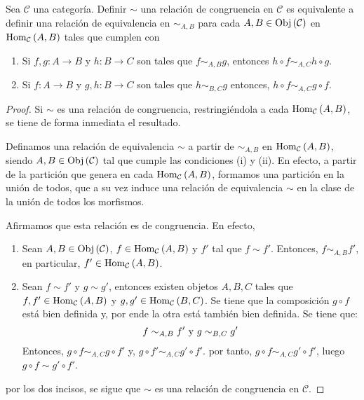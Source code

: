 \documentclass[12pt]{report}
\theoremstyle{largebreak}
\newcommand\cf[3]{\ensuremath{#1:#2\rightarrow#3}}
\newcommand{\Obj}[1]{\ensuremath{\textup{Obj}\left(#1\right)}}
\newcommand{\Hom}[3]{\ensuremath{\textup{Hom}_{#1}\left(#2,#3\right)}}
\begin{document}
    \begin{propo}
        Sea $\mathcal{C}$ una categoría. Definir $\sim$ una relación de congruencia en $\mathcal{C}$ es equivalente a definir una relación de equivalencia en $\sim_{A,B}$ para cada $A,B\in\Obj{\mathcal{C}}$ en $\Hom{\mathcal{C}}{A}{B}$ tales que cumplen con
        \begin{enumerate}
            \item Si $\cf{f,g}{A}{B}$ y $\cf{h}{B}{C}$ son tales que $f\sim_{A,B}g$, entonces $h\circ f\sim_{A,C}h\circ g$.
            \item Si $\cf{f}{A}{B}$ y $\cf{g,h}{B}{C}$ son tales que $h\sim_{B,C}g$ entonces, $h\circ f\sim_{A,C}g\circ f$.
        \end{enumerate}
    \end{propo}

    \begin{proof}
        Si $\sim$ es una relación de congruencia, restringiéndola a cada $\Hom{\mathcal{C}}{A}{B}$, se tiene de forma inmediata el resultado.

        Definamos una relación de equivalencia $\sim$ a partir de $\sim_{A,B}$ en $\Hom{\mathcal{C}}{A}{B}$, siendo $A,B\in\Obj{\mathcal{C}}$ tal que cumple las condiciones (i) y (ii). En efecto, a partir de la partición que genera en cada $\Hom{\mathcal{C}}{A}{B}$, formamos una partición en la unión de todos, que a su vez induce una relación de equivalencia $\sim$ en la clase de la unión de todos los morfismos.

        Afirmamos que esta relación es de congruencia. En efecto,
        \begin{enumerate}
            \item Sean $A,B\in\Obj{\mathcal{C}}$, $f\in\Hom{\mathcal{C}}{A}{B}$ y $f'$ tal que $f\sim f'$. Entonces, $f\sim_{A,B}f'$, en particular, $f'\in\Hom{\mathcal{C}}{A}{B}$.
            \item Sean $f\sim f'$ y $g\sim g'$, entonces existen objetos $A,B,C$ tales que $f,f'\in\Hom{\mathcal{C}}{A}{B}$ y $g,g'\in\Hom{\mathcal{C}}{B}{C}$. Se tiene que la composición $g\circ f$ está bien definida y, por ende la otra está también bien definida. Se tiene que:
            \begin{equation*}
                f\sim_{A,B}f'\textup{ y }g\sim_{B,C}g'
            \end{equation*}
            Entonces, $g\circ f\sim_{A,C}g\circ f'$ y, $g\circ f'\sim_{A,C}g'\circ f'$. por tanto, $g\circ f\sim_{A,C}g'\circ f'$, luego $g\circ f\sim g'\circ f'$.
        \end{enumerate}
        por los dos incisos, se sigue que $\sim$ es una relación de congruencia en $\mathcal{C}$.
    \end{proof}
\end{document}
